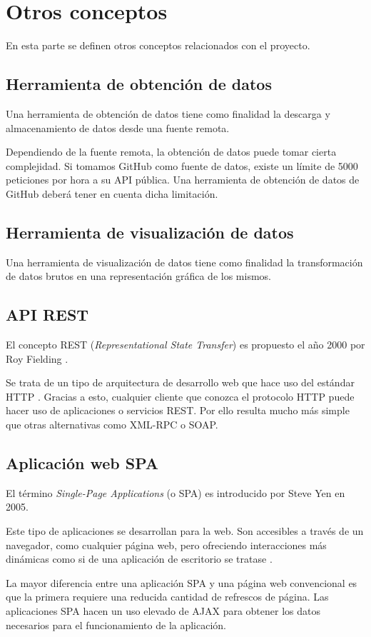 \section{Otros conceptos}

En esta parte se definen otros conceptos relacionados con el proyecto.

\subsection{Herramienta de obtención de datos}

Una herramienta de obtención de datos tiene como finalidad la descarga y almacenamiento de datos desde una fuente remota.

Dependiendo de la fuente remota, la obtención de datos puede tomar cierta complejidad. Si tomamos GitHub como fuente de datos, existe un límite de 5000 peticiones por hora a su API pública. Una herramienta de obtención de datos de GitHub deberá tener en cuenta dicha limitación.

\subsection{Herramienta de visualización de datos}

Una herramienta de visualización de datos tiene como finalidad la transformación de datos brutos en una representación gráfica de los mismos.

\subsection{API REST}

El concepto REST (\textit{Representational State Transfer}) es propuesto el año 2000 por Roy Fielding \cite{fielding2000architectural}.

Se trata de un tipo de arquitectura de desarrollo web que hace uso del estándar HTTP \cite{asiermarques:rest}. Gracias a esto, cualquier cliente que conozca el protocolo HTTP puede hacer uso de aplicaciones o servicios REST. Por ello resulta mucho más simple que otras alternativas como XML-RPC o SOAP.

\subsection{Aplicación web SPA}

El término \textit{Single-Page Applications} (o SPA) es introducido por Steve Yen en 2005. 

Este tipo de aplicaciones se desarrollan para la web. Son accesibles a través de un navegador, como cualquier página web, pero ofreciendo interacciones más dinámicas como si de una aplicación de escritorio se tratase \cite{codeschool:spa}.

La mayor diferencia entre una aplicación SPA y una página web convencional es que la primera requiere una reducida cantidad de refrescos de página. Las aplicaciones SPA hacen un uso elevado de AJAX para obtener los datos necesarios para el funcionamiento de la aplicación. 